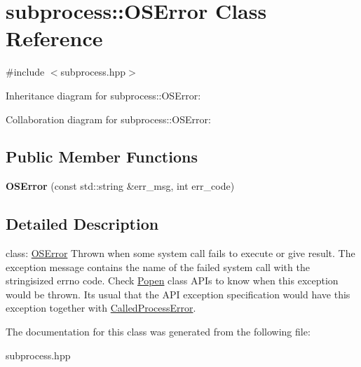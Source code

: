 \hypertarget{classsubprocess_1_1OSError}{}\section{subprocess\+:\+:O\+S\+Error Class Reference}
\label{classsubprocess_1_1OSError}


{\ttfamily \#include $<$subprocess.\+hpp$>$}



Inheritance diagram for subprocess\+:\+:O\+S\+Error\+:


Collaboration diagram for subprocess\+:\+:O\+S\+Error\+:
\subsection*{Public Member Functions}
\begin{DoxyCompactItemize}
\item 
\mbox{\label{classsubprocess_1_1OSError_ac2b4771e9abb7390ac61a7e1d31d1ca1}} 
{\bfseries O\+S\+Error} (const std\+::string \&err\+\_\+msg, int err\+\_\+code)
\end{DoxyCompactItemize}


\subsection{Detailed Description}
class\+: \hyperlink{classsubprocess_1_1OSError}{O\+S\+Error} Thrown when some system call fails to execute or give result. The exception message contains the name of the failed system call with the stringisized errno code. Check \hyperlink{classsubprocess_1_1Popen}{Popen} class A\+PI\textquotesingle{}s to know when this exception would be thrown. Its usual that the A\+PI exception specification would have this exception together with \hyperlink{classsubprocess_1_1CalledProcessError}{Called\+Process\+Error}. 

The documentation for this class was generated from the following file\+:\begin{DoxyCompactItemize}
\item 
subprocess.\+hpp\end{DoxyCompactItemize}
